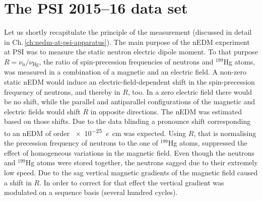 \section{The PSI 2015--16 data set}
Let us shortly recapitulate the principle of the measurement (discussed in detail in Ch.\,\ref{ch:nedm-at-psi-apparatus}).
The main purpose of the nEDM experiment at PSI was to measure the static neutron electric dipole moment.
To that purpose $R = \nu_\text{n} / \nu_\text{Hg}$, the ratio of spin-precession frequencies of neutrons and ${}^{199}$Hg atoms, was measured in a combination of a magnetic and an electric field.
A non-zero static nEDM would induce an electric-field-dependent shift in the spin-precession frequency of neutrons, and thereby in $R$, too.
In a zero electric field there would be no shift, while the parallel and antiparallel configurations of the magnetic and electric fields would shift $R$ in opposite directions.
The nEDM was estimated based on those shifts.
Due to the data blinding
a pronounce shift corresponding to an nEDM of order \SI{e-25}{\elementarycharge\centi\meter} was expected.
Using $R$, that is normalising the precession frequency of neutrons to the one of ${}^{199}$Hg atoms, suppressed the effect of homogeneous variations in the magnetic field.
Even though the neutrons and ${}^{199}$Hg atoms were stored together, the neutrons sagged due to their extremely low speed.
Due to the sag vertical magnetic gradients of the magnetic field caused a shift in $R$.
In order to correct for that effect the vertical gradient was modulated on a sequence basis (several hundred cycles).


